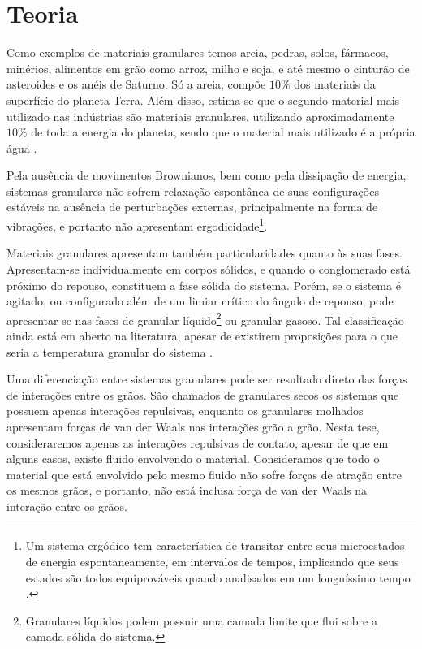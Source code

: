 \section{Teoria}

    Como exemplos de materiais granulares temos areia, pedras, solos, fármacos, minérios, alimentos em grão como arroz, milho e soja, e até mesmo o cinturão de asteroides e os anéis de Saturno. Só a areia, compõe $10\%$ dos materiais da superfície do planeta Terra. Além disso, estima-se que o segundo material mais utilizado nas indústrias são materiais granulares, utilizando aproximadamente $10\%$ de toda a energia do planeta, sendo que o material mais utilizado é a própria água \cite{Sands_Powders_and_Grains}.

    Pela ausência de movimentos Brownianos, bem como pela dissipação de energia, sistemas granulares não sofrem relaxação espontânea de suas configurações estáveis na ausência de perturbações externas, principalmente na forma de vibrações, e portanto não apresentam ergodicidade\footnote{Um sistema ergódico tem característica de transitar entre seus microestados de energia espontaneamente, em intervalos de tempos, implicando que seus estados são todos equiprováveis quando analisados em um longuíssimo tempo \cite{Dissertacao, Srdjan-Tese, Granular_Solids_Liquids_and_Gases}.}.

    Materiais granulares apresentam também particularidades quanto às suas fases. Apresentam-se individualmente em corpos sólidos, e quando o conglomerado está próximo do repouso, constituem a fase sólida do sistema. Porém, se o sistema é agitado, ou configurado além de um limiar crítico do ângulo de repouso, pode apresentar-se nas fases de granular líquido\footnote{Granulares líquidos podem possuir uma camada limite que flui sobre a camada sólida do sistema.} ou granular gasoso. Tal classificação ainda está em aberto na literatura, apesar de existirem proposições para o que seria a temperatura granular do sistema \cite{Granular_Solids_Liquids_and_Gases}.

    Uma diferenciação entre sistemas granulares pode ser resultado direto das forças de interações entre os grãos. São chamados de granulares secos os sistemas que possuem apenas interações repulsivas, enquanto os granulares molhados apresentam forças de van der Waals nas interações grão a grão. Nesta tese, consideraremos apenas as interações repulsivas de contato, apesar de que em alguns casos, existe fluido envolvendo o material. Consideramos que todo o material que está envolvido pelo mesmo fluido não sofre forças de atração entre os mesmos grãos, e portanto, não está inclusa força de van der Waals na interação entre os grãos.

